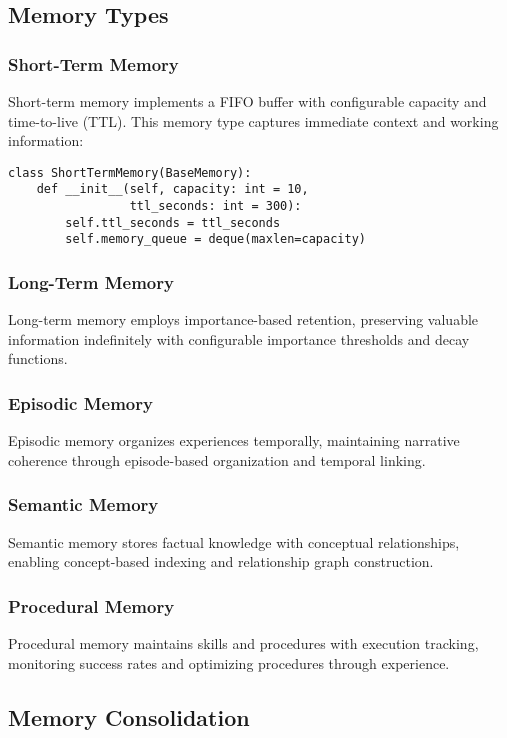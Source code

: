 \documentclass[journal]{IEEEtran}
\begin{document}
\subsection{Memory Types}

\subsubsection{Short-Term Memory}
Short-term memory implements a FIFO buffer with configurable capacity and time-to-live (TTL). This memory type captures immediate context and working information:

\begin{lstlisting}
class ShortTermMemory(BaseMemory):
    def __init__(self, capacity: int = 10, 
                 ttl_seconds: int = 300):
        self.ttl_seconds = ttl_seconds
        self.memory_queue = deque(maxlen=capacity)
\end{lstlisting}

\subsubsection{Long-Term Memory}
Long-term memory employs importance-based retention, preserving valuable information indefinitely with configurable importance thresholds and decay functions.

\subsubsection{Episodic Memory}
Episodic memory organizes experiences temporally, maintaining narrative coherence through episode-based organization and temporal linking.

\subsubsection{Semantic Memory}
Semantic memory stores factual knowledge with conceptual relationships, enabling concept-based indexing and relationship graph construction.

\subsubsection{Procedural Memory}
Procedural memory maintains skills and procedures with execution tracking, monitoring success rates and optimizing procedures through experience.

\subsection{Memory Consolidation}
\end{document}
